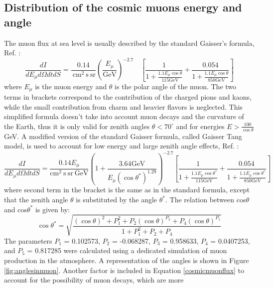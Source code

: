 \subsection{Distribution of the cosmic muons energy and angle}\label{distcos}
The muon flux at sea level is usually described by the standard Gaisser's formula, Ref. \cite{guan2015parametrization}:
\begin{equation}
    \frac{d I}{d E_\mu d \Omega d t d S}=\frac{0.14}{\mathrm{~cm}^2 \mathrm{~s} \ \mathrm{sr}}\left(\frac{E_\mu}{\mathrm{GeV}}\right)^{-2.7} \quad\left[\frac{1}{1+\frac{1.1 E_\mu \cos \theta}{115 \mathrm{GeV}}}+\frac{0.054}{1+\frac{1.1 E_\mu \cos \theta}{850 \mathrm{GeV}}}\right]
    \end{equation}
where $E_\mu$ is the muon energy and $\theta$ is the polar angle of the muon. 
The two terms in brackets correspond to the contribution of the charged pions and kaons, while 
the small contribution from charm and heavier flavors is neglected. 
This simplified formula doesn't take into account muon decays and the curvature of the Earth, 
thus it is only valid for zenith angles $\theta < 70^\circ$ and for energies $E > \frac{100}{\cos \theta}$ GeV.
A modified version of the standard Gaisser formula, called Gaisser Tang model, is used to account for low energy and large zenith angle effects, Ref. \cite{guan2015parametrization}:
\begin{equation}\label{cosmicmuonflux}
    \frac{d I}{d E_\mu d \Omega d t d S}=\frac{0.14 E_\mu}{\mathrm{cm}^2 \mathrm{~s} \ \mathrm{sr} \ \mathrm{GeV}}\left(1+\frac{3.64 \mathrm{GeV}}{E_\mu\left(\cos \theta^*\right)^{1.29}}\right)^{-2.7}\left[\frac{1}{1+\frac{1.1 E_\mu \cos \theta^*}{115 \mathrm{GeV}}}+\frac{0.054}{1+\frac{1.1 E_\mu \cos \theta^*}{850 \mathrm{GeV}}}\right]
\end{equation}
where second term in the bracket is the same as in the standard formula, except that the zenith angle 
$\theta$ is substituted by the angle $\theta^*$. The relation between cos$\theta$
and cos$\theta^*$ is given by:
\begin{equation}
    \cos \theta^*=\sqrt{\frac{(\cos \theta)^2+P_1^2+P_2(\cos \theta)^{P_3}+P_4(\cos \theta)^{P_5}}{1+P_1^2+P_2+P_4}}
    \end{equation}
The parameters $P_1$ = 0.102573, $P_2$ = -0.068287, $P_3$ = 0.958633, $P_4$ = 0.0407253, and $P_5$ = 0.817285 were calculated using 
a dedicated simulation of muon production in the atmosphere. A representation of the angles is shown in Figure \ref{fig:anglesinmuon}.
Another factor is included in Equation \ref{cosmicmuonflux} to account for the possibility of muon decays, which are more 
